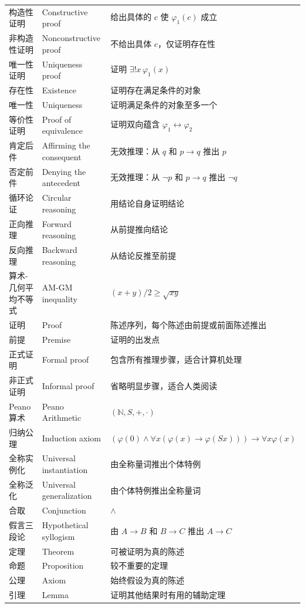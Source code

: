 \documentclass[UTF8,11pt,a4paper]{ctexbook}   %
\theoremstyle{definition}
\begin{document}
\begin{longtable}{|p{4.8cm}|p{4.8cm}|p{4.8cm}|}
构造性证明 & Constructive proof & 给出具体的 $c$ 使 $\varphi_1(c)$ 成立 \\
非构造性证明 & Nonconstructive proof & 不给出具体 $c$，仅证明存在性 \\
唯一性证明 & Uniqueness proof & 证明 $\exists!x\,\varphi_1(x)$ \\
存在性 & Existence & 证明存在满足条件的对象 \\
唯一性 & Uniqueness & 证明满足条件的对象至多一个 \\
等价性证明 & Proof of equivalence & 证明双向蕴含 $\varphi_1 \leftrightarrow \varphi_2$ \\
肯定后件 & Affirming the consequent & 无效推理：从 $q$ 和 $p\to q$ 推出 $p$ \\
否定前件 & Denying the antecedent & 无效推理：从 $\neg p$ 和 $p\to q$ 推出 $\neg q$ \\
循环论证 & Circular reasoning & 用结论自身证明结论 \\
正向推理 & Forward reasoning & 从前提推向结论 \\
反向推理 & Backward reasoning & 从结论反推至前提 \\
算术-几何平均不等式 & AM-GM inequality & $(x+y)/2 \geq \sqrt{xy}$ \\
\hline
证明 & Proof & 陈述序列，每个陈述由前提或前面陈述推出 \\
前提 & Premise & 证明的出发点 \\
正式证明 & Formal proof & 包含所有推理步骤，适合计算机处理 \\
非正式证明 & Informal proof & 省略明显步骤，适合人类阅读 \\
Peano算术 & Peano Arithmetic & $(\mathbb{N}, S, +, \cdot)$ \\
归纳公理 & Induction axiom & $(\varphi(0)\land\forall x(\varphi(x)\to\varphi(Sx)))\to\forall x\varphi(x)$ \\
全称实例化 & Universal instantiation & 由全称量词推出个体特例 \\
全称泛化 & Universal generalization & 由个体特例推出全称量词 \\
合取 & Conjunction & $\land$ \\
假言三段论 & Hypothetical syllogism & 由 $A\to B$ 和 $B\to C$ 推出 $A\to C$ \\
定理 & Theorem & 可被证明为真的陈述 \\
命题 & Proposition & 较不重要的定理 \\
公理 & Axiom & 始终假设为真的陈述 \\
引理 & Lemma & 证明其他结果时有用的辅助定理 \\

\end{longtable}
\end{document}
